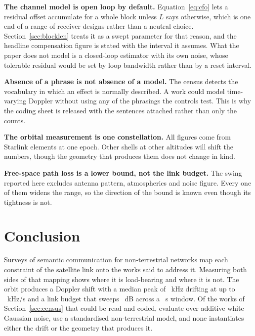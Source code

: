 \documentclass[preprint,11pt,3p]{elsarticle}
\begin{document}
\textbf{The channel model is open loop by default.} Equation~\eqref{eq:cfo} lets a residual
offset accumulate for a whole block unless $L$ says otherwise, which is one end of a range of
receiver designs rather than a neutral choice. Section~\ref{sec:blocklen} treats it as a swept
parameter for that reason, and the headline compensation figure is stated with the interval it
assumes. What the paper does not model is a closed-loop estimator with its own noise, whose
tolerable residual would be set by loop bandwidth rather than by a reset interval.

\textbf{Absence of a phrase is not absence of a model.} The census detects the vocabulary in
which an effect is normally described. A work could model time-varying Doppler without using any
of the phrasings the controls test. This is why the coding sheet is released with the sentences
attached rather than only the counts.

\textbf{The orbital measurement is one constellation.} All figures come from Starlink elements at
one epoch. Other shells at other altitudes will shift the numbers, though the geometry that
produces them does not change in kind.

\textbf{Free-space path loss is a lower bound, not the link budget.} The swing reported here
excludes antenna pattern, atmospherics and noise figure. Every one of them widens the range, so
the direction of the bound is known even though its tightness is not.

\section{Conclusion}

Surveys of semantic communication for non-terrestrial networks map each constraint of the
satellite link onto the works said to address it. Measuring both sides of that mapping shows
where it is load-bearing and where it is not. The orbit produces a Doppler shift with a median
peak of \numDopKaMed~kHz drifting at up to \numDopRateMax~kHz/s and a link budget that sweeps
\numFsplMed~dB across a \numDurMed~s window. Of the \numCoded{} works of Section~\ref{sec:census} that could be read and coded,
\numEvCHAWGN{} evaluate over additive white Gaussian noise, \numEvCHGPP{} use a standardised
non-terrestrial model, and none instantiates either the drift or the geometry that produces it.
\end{document}
